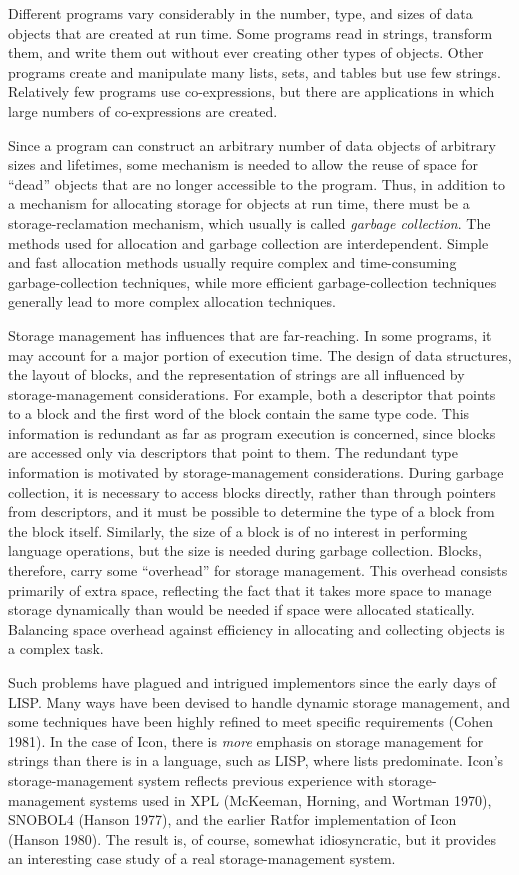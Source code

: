 Different programs vary considerably in the number, type, and sizes of
data objects that are created at run time. Some programs read in
strings, transform them, and write them out without ever creating
other types of objects. Other programs create and manipulate many
lists, sets, and tables but use few strings. Relatively few programs
use co-expressions, but there are applications in which large numbers
of co-expressions are created.

Since a program can construct an arbitrary number of data objects of
arbitrary sizes and lifetimes, some mechanism is needed to allow the
reuse of space for ``dead'' objects that are
no longer accessible to the program. Thus, in addition to a mechanism
for allocating storage for objects at run time, there must be a
storage-reclamation mechanism, which usually is called \textit{garbage
collection}. The methods used for allocation and garbage collection
are interdependent. Simple and fast allocation methods usually require
complex and time-consuming garbage-collection techniques, while more
efficient garbage-collection techniques generally lead to more complex
allocation techniques.

Storage management has influences that are far-reaching. In some
programs, it may account for a major portion of execution time. The
design of data structures, the layout of blocks, and the
representation of strings are all influenced by storage-management
considerations. For example, both a descriptor that points to a block
and the first word of the block contain the same type code. This
information is redundant as far as program execution is concerned,
since blocks are accessed only via descriptors that point to them. The
redundant type information is motivated by storage-management
considerations. During garbage collection, it is necessary to access
blocks directly, rather than through pointers from descriptors, and it
must be possible to determine the type of a block from the block
itself.  Similarly, the size of a block is of no interest in
performing language operations, but the size is needed during garbage
collection. Blocks, therefore, carry some ``overhead'' for storage
management. This overhead consists primarily of extra space,
reflecting the fact that it takes more space to manage storage
dynamically than would be needed if space were allocated
statically. Balancing space overhead against efficiency in allocating
and collecting objects is a complex task.

Such problems have plagued and intrigued implementors since the early
days of LISP. Many ways have been devised to handle dynamic storage
management, and some techniques have been highly refined to meet
specific requirements (Cohen 1981). In the case of Icon, there is
\textit{more }emphasis on storage management for strings than there is
in a language, such as LISP, where lists predominate. Icon's
storage-management system reflects previous experience with
storage-management systems used in XPL (McKeeman, Horning, and Wortman
1970), SNOBOL4 (Hanson 1977), and the earlier Ratfor implementation of
Icon (Hanson 1980). The result is, of course, somewhat idiosyncratic,
but it provides an interesting case study of a real storage-management
system.

